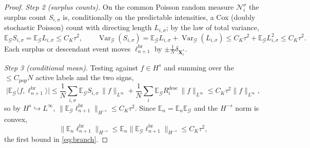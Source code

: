 \documentclass[a4paper,fleqn]{cas-sc}
\theoremstyle{definition}
\theoremstyle{remark}
\begin{document}
\begin{proof}
\emph{Step 2 (surplus counts).} On the common Poisson random measure
$\mathcal N^\sigma_i$ the surplus count $S_{i,\sigma}$ is, conditionally on the
predictable intensities, a Cox (doubly stochastic Poisson) count with directing
length $L_{i,\sigma}$; by the law of total variance,
\[
\mathbb E_{\mathcal G}S_{i,\sigma}=\mathbb E_{\mathcal G}L_{i,\sigma}\le C_K\tau^2,
\qquad
\operatorname{Var}_{\mathcal G}(S_{i,\sigma})
=\mathbb E_{\mathcal G}L_{i,\sigma}+\operatorname{Var}_{\mathcal G}(L_{i,\sigma})
\le C_K\tau^2+\mathbb E_{\mathcal G}L_{i,\sigma}^2\le C_K\tau^2 .
\]
Each surplus or descendant event moves $\ell^{\mathrm{br}}_{n+1}$ by
$\pm\frac1N\delta_{\mathbf X^*_i}$.

\emph{Step 3 (conditional mean).} Testing against $f\in H^s$ and summing over the
$\le C_{\mathrm{pop}}N$ active labels and the two signs,
\[
\bigl|\mathbb E_{\mathcal G}\langle f,\ell^{\mathrm{br}}_{n+1}\rangle\bigr|
\le\frac1N\sum_{i,\sigma}\mathbb E_{\mathcal G}S_{i,\sigma}\,\|f\|_{L^\infty}
+\frac1N\sum_i\mathbb E_{\mathcal G}R^{\mathrm{desc}}_i\,\|f\|_{L^\infty}
\le C_K\tau^2\|f\|_{L^\infty},
\]
so by $H^s\hookrightarrow L^\infty$,
$\|\mathbb E_{\mathcal G}\ell^{\mathrm{br}}_{n+1}\|_{H^{-s}}\le C_K\tau^2$. Since
$\mathbb E_n=\mathbb E_n\mathbb E_{\mathcal G}$ and the $H^{-s}$ norm is convex,
\[
\|\mathbb E_n\ell^{\mathrm{br}}_{n+1}\|_{H^{-s}}
\le\mathbb E_n\|\mathbb E_{\mathcal G}\ell^{\mathrm{br}}_{n+1}\|_{H^{-s}}\le C_K\tau^2,
\]
the first bound in \eqref{eq:branch}.


\end{proof}
\end{document}

